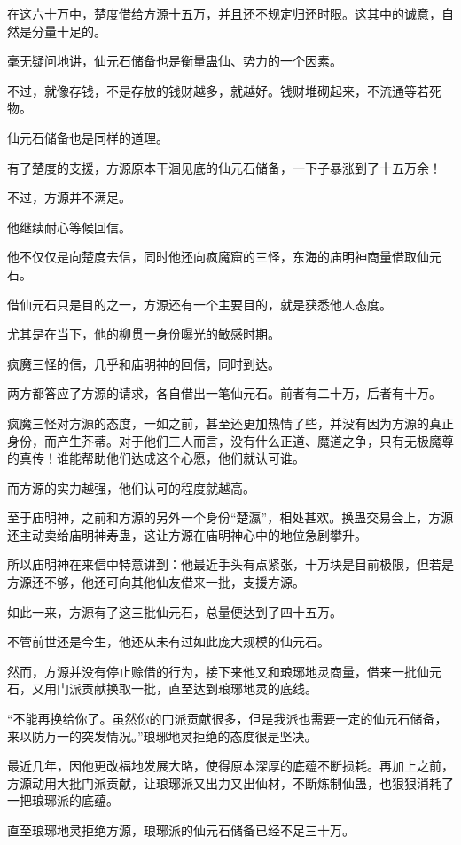 \begin{this_body}
在这六十万中，楚度借给方源十五万，并且还不规定归还时限。这其中的诚意，自然是分量十足的。

毫无疑问地讲，仙元石储备也是衡量蛊仙、势力的一个因素。

不过，就像存钱，不是存放的钱财越多，就越好。钱财堆砌起来，不流通等若死物。

仙元石储备也是同样的道理。

有了楚度的支援，方源原本干涸见底的仙元石储备，一下子暴涨到了十五万余！

不过，方源并不满足。

他继续耐心等候回信。

他不仅仅是向楚度去信，同时他还向疯魔窟的三怪，东海的庙明神商量借取仙元石。

借仙元石只是目的之一，方源还有一个主要目的，就是获悉他人态度。

尤其是在当下，他的柳贯一身份曝光的敏感时期。

疯魔三怪的信，几乎和庙明神的回信，同时到达。

两方都答应了方源的请求，各自借出一笔仙元石。前者有二十万，后者有十万。

疯魔三怪对方源的态度，一如之前，甚至还更加热情了些，并没有因为方源的真正身份，而产生芥蒂。对于他们三人而言，没有什么正道、魔道之争，只有无极魔尊的真传！谁能帮助他们达成这个心愿，他们就认可谁。

而方源的实力越强，他们认可的程度就越高。

至于庙明神，之前和方源的另外一个身份“楚瀛”，相处甚欢。换蛊交易会上，方源还主动卖给庙明神寿蛊，这让方源在庙明神心中的地位急剧攀升。

所以庙明神在来信中特意讲到：他最近手头有点紧张，十万块是目前极限，但若是方源还不够，他还可向其他仙友借来一批，支援方源。

如此一来，方源有了这三批仙元石，总量便达到了四十五万。

不管前世还是今生，他还从未有过如此庞大规模的仙元石。

然而，方源并没有停止赊借的行为，接下来他又和琅琊地灵商量，借来一批仙元石，又用门派贡献换取一批，直至达到琅琊地灵的底线。

“不能再换给你了。虽然你的门派贡献很多，但是我派也需要一定的仙元石储备，来以防万一的突发情况。”琅琊地灵拒绝的态度很是坚决。

最近几年，因他更改福地发展大略，使得原本深厚的底蕴不断损耗。再加上之前，方源动用大批门派贡献，让琅琊派又出力又出仙材，不断炼制仙蛊，也狠狠消耗了一把琅琊派的底蕴。

直至琅琊地灵拒绝方源，琅琊派的仙元石储备已经不足三十万。


\end{this_body}
